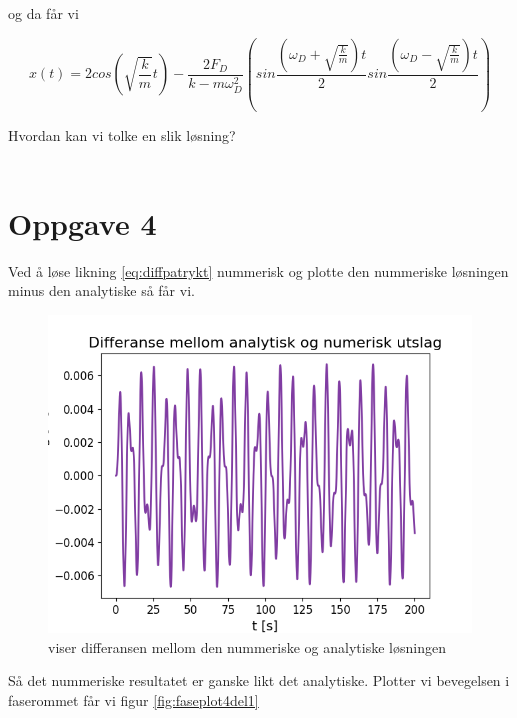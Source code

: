 \documentclass[norsk,a4paper,12pt]{article}
\begin{document}
og da får vi

\begin{equation}
	x(t) = 2 cos \left(\sqrt{\frac{k}{m}}t \right) - \frac{2F_D}{k-m\omega_D^2} \left(sin\frac{\left(\omega_D + \sqrt{\frac{k}{m}} \right)t}{2} sin\frac{\left(\omega_D - \sqrt{\frac{k}{m}} \right)t}{2} \right)
\end{equation}

Hvordan kan vi tolke en slik løsning?
\\
\\

\section*{Oppgave 4}
Ved å løse likning \ref{eq:diffpatrykt} nummerisk og plotte den nummeriske løsningen minus den analytiske så får vi.

\begin{figure}[h]
\begin{center}
\includegraphics[scale=0.8]{Oppgave4_differanse.png}
\caption{viser differansen mellom den nummeriske og analytiske løsningen}
\label{fig:differanseplot}
\end{center}
\end{figure}

Så det nummeriske resultatet er ganske likt det analytiske. Plotter vi bevegelsen i faserommet får vi figur \ref{fig:faseplot4del1}
\end{document}

